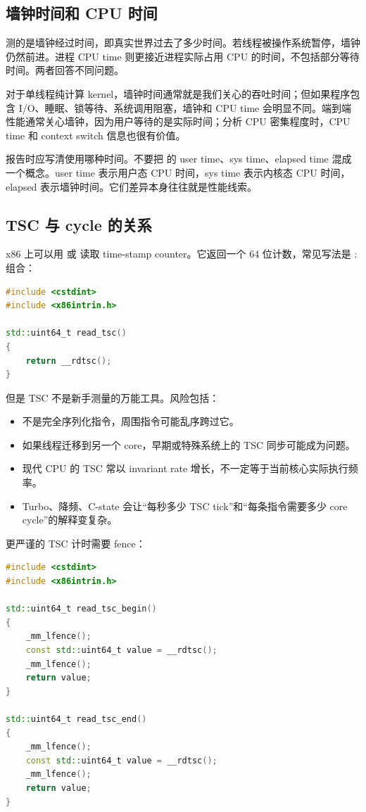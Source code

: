 \subsection{墙钟时间和 CPU 时间}

 测的是墙钟经过时间，即真实世界过去了多少时间。若线程被操作系统暂停，墙钟仍然前进。进程 CPU time 则更接近进程实际占用 CPU 的时间，不包括部分等待时间。两者回答不同问题。

对于单线程纯计算 kernel，墙钟时间通常就是我们关心的吞吐时间；但如果程序包含 I/O、睡眠、锁等待、系统调用阻塞，墙钟和 CPU time 会明显不同。端到端性能通常关心墙钟，因为用户等待的是实际时间；分析 CPU 密集程度时，CPU time 和 context switch 信息也很有价值。

报告时应写清使用哪种时间。不要把  的 user time、sys time、elapsed time 混成一个概念。user time 表示用户态 CPU 时间，sys time 表示内核态 CPU 时间，elapsed 表示墙钟时间。它们差异本身往往就是性能线索。

\subsection{TSC 与 cycle 的关系}

x86 上可以用  或  读取 time-stamp counter。它返回一个 64 位计数，常见写法是 : 组合：

\begin{lstlisting}[language=C++]
#include <cstdint>
#include <x86intrin.h>

std::uint64_t read_tsc()
{
    return __rdtsc();
}
\end{lstlisting}

但是 TSC 不是新手测量的万能工具。风险包括：

\begin{itemize}
  \item {} 不是完全序列化指令，周围指令可能乱序跨过它。
  \item 如果线程迁移到另一个 core，早期或特殊系统上的 TSC 同步可能成为问题。
  \item 现代 CPU 的 TSC 常以 invariant rate 增长，不一定等于当前核心实际执行频率。
  \item Turbo、降频、C-state 会让“每秒多少 TSC tick”和“每条指令需要多少 core cycle”的解释变复杂。
\end{itemize}

更严谨的 TSC 计时需要 fence：

\begin{lstlisting}[language=C++]
#include <cstdint>
#include <x86intrin.h>

std::uint64_t read_tsc_begin()
{
    _mm_lfence();
    const std::uint64_t value = __rdtsc();
    _mm_lfence();
    return value;
}

std::uint64_t read_tsc_end()
{
    _mm_lfence();
    const std::uint64_t value = __rdtsc();
    _mm_lfence();
    return value;
}
\end{lstlisting}

